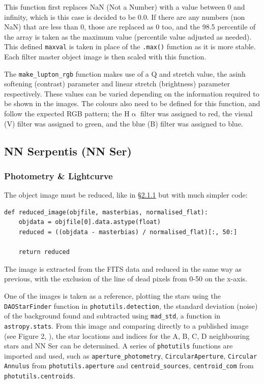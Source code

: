 \documentclass[11pt, a4paper, twocolumn]{article}
\begin{document}
This function first replaces NaN (Not a Number) with a value between 0 and infinity, which is this case is decided to be 0.0. If there are any numbers (non NaN) that are less than 0, those are replaced as 0 too, and the 98.5 percentile of the array is taken as the maximum value (percentile value adjusted as needed). This defined \verb|maxval| is taken in place of the \verb|.max()| function as it is more stable. Each filter master object image is then scaled with this function.

The \verb|make_lupton_rgb| function makes use of a Q and stretch value, the asinh softening (contrast) parameter and linear stretch (brightness) parameter respectively. These values can be varied depending on the information required to be shown in the images. The colours also need to be defined for this function, and follow the expected RGB pattern; the H$\upalpha$ filter was assigned to red, the visual (V) filter was assigned to green, and the blue (B) filter was assigned to blue.

\subsection{NN Serpentis (NN Ser)}
\subsubsection{Photometry \& Lightcurve}

The object image must be reduced, like in \hyperref[sec:2.1.1]{§2.1.1} but with much simpler code:

\begin{lstlisting}
def reduced_image(objfile, masterbias, normalised_flat):
    objdata = objfile[0].data.astype(float)
    reduced = ((objdata - masterbias) / normalised_flat)[:, 50:]

    return reduced
\end{lstlisting}

The image is extracted from the FITS data and reduced in the same way as previous, with the exclusion of the line of dead pixels from 0-50 on the x-axis.

One of the images is taken as a reference, plotting the stars using the \verb|DAOStarFinder| function in \verb|photutils.detection|, the standard deviation (noise) of the background found and subtracted using \verb|mad_std|, a function in \verb|astropy.stats|. From this image and comparing directly to a published image (see Figure 2, \cite{parsons2010precise}), the star locations and indices for the A, B, C, D neighbouring stars and NN Ser can be determined. A series of \verb|photutils| functions are imported and used, such as \verb|aperture_photometry|, \verb|CircularAperture|, \verb|Circular Annulus| from \verb|photutils.aperture| and \verb|centroid_sources|, \verb|centroid_com| from \verb|photutils.centroids|.
\end{document}
